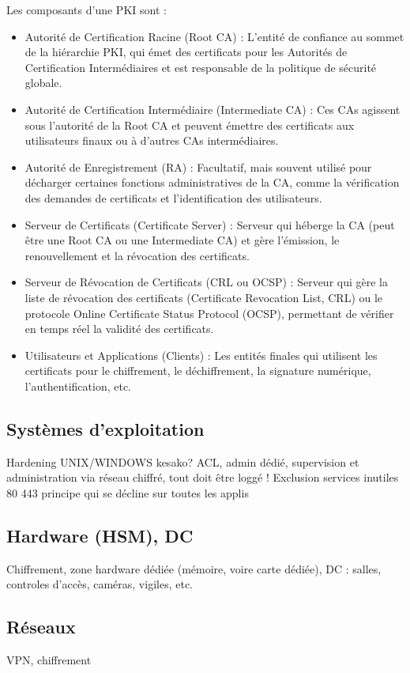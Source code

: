 Les composants d'une PKI sont :
\begin{itemize}
    \item Autorité de Certification Racine (Root CA) : L'entité de confiance au sommet de la hiérarchie PKI, qui émet des certificats pour les Autorités de Certification Intermédiaires et est responsable de la politique de sécurité globale.
    \item Autorité de Certification Intermédiaire (Intermediate CA) : Ces CAs agissent sous l'autorité de la Root CA et peuvent émettre des certificats aux utilisateurs finaux ou à d'autres CAs intermédiaires.
    \item Autorité de Enregistrement (RA) : Facultatif, mais souvent utilisé pour décharger certaines fonctions administratives de la CA, comme la vérification des demandes de certificats et l'identification des utilisateurs.
    \item Serveur de Certificats (Certificate Server) : Serveur qui héberge la CA (peut être une Root CA ou une Intermediate CA) et gère l'émission, le renouvellement et la révocation des certificats.
    \item Serveur de Révocation de Certificats (CRL ou OCSP) : Serveur qui gère la liste de révocation des certificats (Certificate Revocation List, CRL) ou le protocole Online Certificate Status Protocol (OCSP), permettant de vérifier en temps réel la validité des certificats.
    \item Utilisateurs et Applications (Clients) : Les entités finales qui utilisent les certificats pour le chiffrement, le déchiffrement, la signature numérique, l'authentification, etc.
\end{itemize}


\subsection{Systèmes d'exploitation}
Hardening UNIX/WINDOWS kesako?
ACL, admin dédié, supervision et administration via réseau chiffré, tout doit être loggé ! Exclusion services inutiles
80 443 principe qui se décline sur toutes les applis
\subsection{Hardware (HSM), DC}
Chiffrement, zone hardware dédiée (mémoire, voire carte dédiée), 
DC : salles, controles d’accès, caméras, vigiles, etc.
\subsection{Réseaux}
VPN, chiffrement


